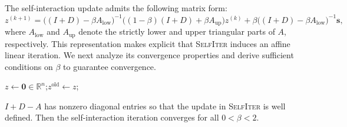 \documentclass[sigconf,review, nonacm]{acmart}
\newcommand\s{\boldsymbol{\mathit{s}}}
\newcommand\zz{\boldsymbol{\mathit{z}}}
\renewcommand\AA{\boldsymbol{\mathit{A}}}
\newcommand\DD{\boldsymbol{\mathit{D}}}
\newcommand\II{\boldsymbol{\mathit{I}}}
\begin{document}
The self-interaction update admits the following matrix form:
$
\mathbf{\zz}^{(k+1)}
=
\bigl( (\II+\DD) - \beta \AA_{\mathrm{low}} \bigr)^{-1}
\bigl( (1-\beta)(\II+\DD) + \beta \AA_{\mathrm{up}} \bigr)\mathbf{\zz}^{(k)}
+ \beta \bigl( (\II+\DD) - \beta \AA_{\mathrm{low}} \bigr)^{-1}\mathbf{s},
$
where $\AA_{\mathrm{low}}$ and $\AA_{\mathrm{up}}$ denote the strictly lower and upper
triangular parts of $\AA$, respectively.
This representation makes explicit that \textsc{SelfIter} induces an affine linear iteration.
We next analyze its convergence properties and derive sufficient conditions on $\beta$
to guarantee convergence.








\begin{algorithm}[t]
	\caption{SelfIter($G,\s,\beta,T_{max},\epsilon$)}
	\label{alg:memo-iter}
	\DontPrintSemicolon
	
	$z \gets \mathbf{0}\in\mathbb{R}^n$;\quad $z^{\mathrm{old}}\gets z$;
	
\end{algorithm}


\begin{lemma}
\label{lem:conv}
$\II+\DD-\AA$ has nonzero diagonal entries so that the update in \textsc{SelfIter}
is well defined.
Then the self-interaction iteration converges for all $0<\beta<2$.
\end{lemma}
\end{document}
